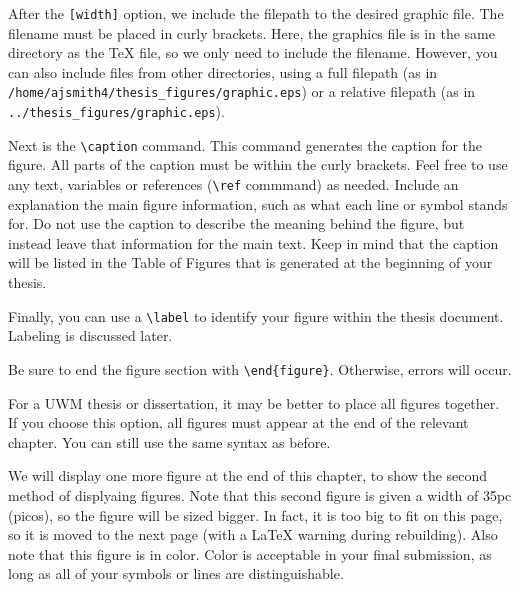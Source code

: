 \documentclass[master]{UWMThesis}
\begin{document}
After the \verb=[width]= option, we include the filepath to the desired graphic file.  The filename must be placed in curly brackets.  Here, the graphics file is in the same directory as the TeX file, so we only need to include the filename.  However, you can also include files from other directories, using a full filepath (as in \verb=/home/ajsmith4/thesis_figures/graphic.eps=) or a relative filepath (as in \verb=../thesis_figures/graphic.eps=).

Next is the \verb=\caption= command.  This command generates the caption for the figure.  All parts of the caption must be within the curly brackets.  Feel free to use any text, variables or references (\verb=\ref= commmand) as needed.  Include an explanation the main figure information, such as what each line or symbol stands for.  Do not use the caption to describe the meaning behind the figure, but instead leave that information for the main text.  Keep in mind that the caption will be listed in the Table of Figures that is generated at the beginning of your thesis.

Finally, you can use a \verb=\label= to identify your figure within the thesis document.  Labeling is discussed later.

Be sure to end the figure section with \verb=\end{figure}=.  Otherwise, errors will occur.


For a UWM thesis or dissertation, it may be better to place all figures together.  If you choose this option, all figures must appear at the end of the relevant chapter.  You can still use the same syntax as before.

We will display one more figure at the end of this chapter, to show the second method of displyaing figures.  Note that this second figure is given a width of 35pc (picos), so the figure will be sized bigger.  In fact, it is too big to fit on this page, so it is moved to the next page (with a LaTeX warning during rebuilding). Also note that this figure is in color.  Color is acceptable in your final submission, as long as all of your symbols or lines are distinguishable.
\end{document}
